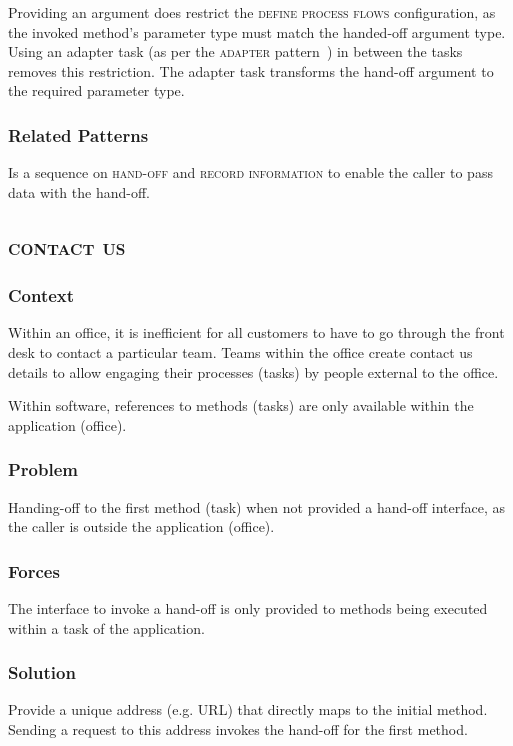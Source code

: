 \documentclass[prodmode]{style/acmlarge}
\begin{document}
Providing an argument does restrict the \textsc{define process flows}
configuration, as the invoked method's parameter type must match the handed-off
argument type.  Using an adapter task (as per the \textsc{adapter}
pattern~\cite{gof}) in between the tasks removes this restriction.  The adapter
task transforms the hand-off argument to the required parameter type.

\subsubsection*{Related Patterns} Is a sequence on \textsc{hand-off} and
\textsc{record information} to enable the caller to pass data with the hand-off.



\subsection{\textsc{\textbf{contact us}}}

\subsubsection*{Context} Within an office, it is inefficient for all customers
to have to go through the front desk to contact a particular team.  Teams within
the office create contact us details to allow engaging their processes (tasks)
by people external to the office.

Within software, references to methods (tasks) are only available within the
application (office).

\subsubsection*{\textbf{Problem}} Handing-off to the first method (task) when not
provided a hand-off interface, as the caller is outside the application
(office).

\subsubsection*{Forces} The interface to invoke a hand-off is only provided to
methods being executed within a task of the application.

\subsubsection*{\textbf{Solution}} Provide a unique address (e.g. URL) that directly maps
to the initial method.  Sending a request to this address invokes the hand-off
for the first method.
\end{document}
